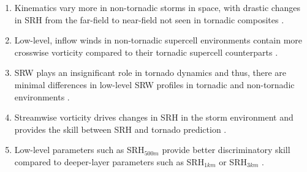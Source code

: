 \begin{enumerate}
    \item Kinematics vary more in non-tornadic storms in space, with drastic changes in SRH from the far-field to near-field not seen in tornadic composites \citep{parker2014composite}. 
    \item Low-level, inflow winds in non-tornadic supercell environments contain more crosswise vorticity compared to their tornadic supercell counterparts \citep{parker2014composite}.
    \item SRW plays an insignificant role in tornado dynamics and thus, there are minimal differences in low-level SRW profiles in tornadic and non-tornadic environments \citep{peters2023disentangling}.
    \item Streamwise vorticity drives changes in SRH in the storm environment and provides the skill between SRH and tornado prediction \citep{peters2023disentangling}.
    \item Low-level parameters such as SRH$_{500m}$ provide better discriminatory skill compared to deeper-layer parameters such as SRH$_{1km}$ or SRH$_{3km}$ \citep{coffer2019using, coniglio2020insights}.
\end{enumerate}